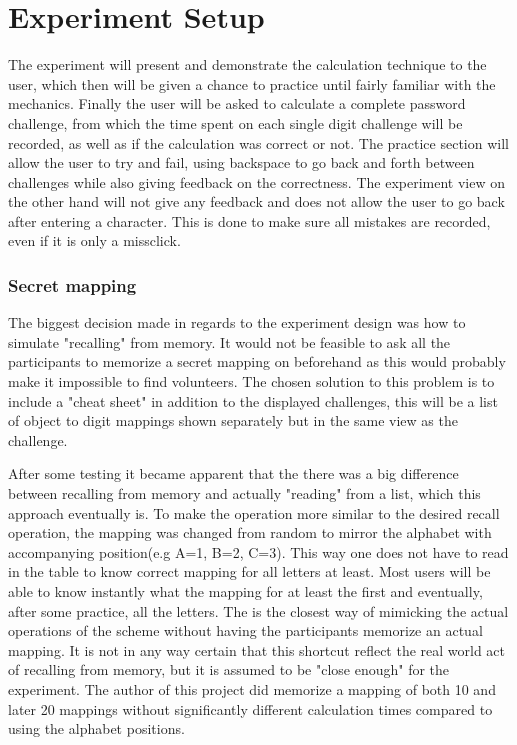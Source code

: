 \section{Experiment Setup}
The experiment will present and demonstrate the calculation technique to the user, which then will be given a chance to practice until fairly familiar with the mechanics. Finally the user will be asked to calculate a complete password challenge, from which the time spent on each single digit challenge will be recorded, as well as if the calculation was correct or not. The practice section will allow the user to try and fail, using backspace to go back and forth between challenges while also giving feedback on the correctness. The experiment view on the other hand will not give any feedback and does not allow the user to go back after entering a character. This is done to make sure all mistakes are recorded, even if it is only a missclick. 
\subsubsection{Secret mapping} The biggest decision made in regards to the experiment design was how to simulate "recalling" from memory. It would not be feasible to ask all the participants to memorize a secret mapping on beforehand as this would probably make it impossible to find volunteers. The chosen solution to this problem is to include a "cheat sheet" in addition to the displayed challenges, this will be a list of object to digit mappings shown separately but in the same view as the challenge.
\par After some testing it became apparent that the there was a big difference between recalling from memory and actually "reading" from a list, which this approach eventually is. To make the operation more similar to the desired recall operation, the mapping was changed from random to mirror the alphabet with accompanying position(e.g A=1, B=2, C=3). This way one does not have to read in the table to know correct mapping for all letters at least. Most users will be able to know instantly what the mapping for at least the first and eventually, after some practice, all the letters. The is the closest way of mimicking the actual operations of the scheme without having the participants memorize an actual mapping. It is not in any way certain that this shortcut reflect the real world act of recalling from memory, but it is assumed to be "close enough" for the experiment. The author of this project did memorize a mapping of both 10 and later 20 mappings without significantly different calculation times compared to using the alphabet positions.

